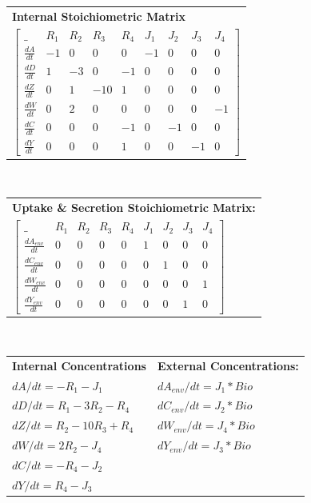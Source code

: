 \begin{tabularx}{\textwidth}{l}
  \textbf{Internal Stoichiometric Matrix} \\

$\begin{bmatrix}
\_ & R_1 & R_2 & R_3 & R_4 & J_1 & J_2 & J_3 & J_4 \\
\frac{dA}{dt} & -1 & 0 & 0 & 0 & -1 & 0 & 0 & 0 \\
\frac{dD}{dt} & 1 & -3 & 0 & -1 & 0 & 0 & 0 & 0 \\
\frac{dZ}{dt} & 0 & 1 & -10 & 1 & 0 & 0 & 0 & 0 \\
\frac{dW}{dt} & 0 & 2 & 0 & 0 & 0 & 0 & 0 & -1 \\
\frac{dC}{dt} & 0 & 0 & 0 & -1 & 0 & -1 & 0 & 0 \\
\frac{dY}{dt} & 0 & 0 & 0 & 1 & 0 & 0 & -1 & 0
\end{bmatrix}$

\end{tabularx}\\

\begin{tabularx}{\textwidth}{l}
  \textbf{Uptake \& Secretion Stoichiometric Matrix:} \\
$\begin{bmatrix}
\_ & R_1 & R_2 & R_3 & R_4 & J_1 & J_2 & J_3 & J_4 \\
\frac{dA_{env}}{dt} & 0 & 0 & 0 & 0 & 1 & 0 & 0 & 0 \\
\frac{dC_{env}}{dt} & 0 & 0 & 0 & 0 & 0 & 1 & 0 & 0 \\
\frac{dW_{env}}{dt} & 0 & 0 & 0 & 0 & 0 & 0 & 0 & 1 \\
\frac{dY_{env}}{dt} & 0 & 0 & 0 & 0 & 0 & 0 & 1 & 0
\end{bmatrix}$

\end{tabularx}\\

\begin{tabularx}{\textwidth}{l|X}
  \textbf{Internal Concentrations} & \textbf{External Concentrations:
} \\


$dA / dt = -R_1 - J_1 $ & $dA_{env} / dt = J_1 * Bio$\\
$dD / dt = R_1 - 3R_2 - R_4$ & $dC_{env} / dt = J_2 * Bio$\\
$dZ / dt = R_2 - 10R_3 + R_4$ & $dW_{env} / dt = J_4 * Bio$\\
$dW/ dt = 2R_2 - J_4$ & $dY_{env} / dt = J_3 * Bio$\\
$dC / dt = - R_4 - J_2$\\
$dY / dt = R_4 - J_3$\\

\end{tabularx}\\


